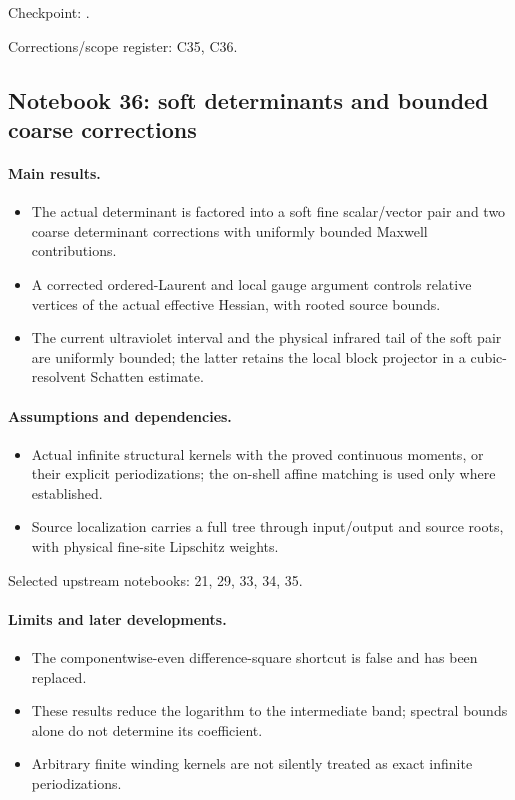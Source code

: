 Checkpoint: .\par
Corrections/scope register: C35, C36.\par

\subsection{Notebook 36: soft determinants and bounded coarse corrections}
\label{hnc-36}
\noindent{}\par

\paragraph{Main results.}
\begin{itemize}
\item The actual determinant is factored into a soft fine scalar/vector pair and two coarse determinant corrections with uniformly bounded Maxwell contributions.
\item A corrected ordered-Laurent and local gauge argument controls relative vertices of the actual effective Hessian, with rooted source bounds.
\item The current ultraviolet interval and the physical infrared tail of the soft pair are uniformly bounded; the latter retains the local block projector in a cubic-resolvent Schatten estimate.
\end{itemize}

\paragraph{Assumptions and dependencies.}
\begin{itemize}
\item Actual infinite structural kernels with the proved continuous moments, or their explicit periodizations; the on-shell affine matching is used only where established.
\item Source localization carries a full tree through input/output and source roots, with physical fine-site Lipschitz weights.
\end{itemize}

Selected upstream notebooks: 21, 29, 33, 34, 35.\par

\paragraph{Limits and later developments.}
\begin{itemize}
\item The componentwise-even difference-square shortcut is false and has been replaced.
\item These results reduce the logarithm to the intermediate band; spectral bounds alone do not determine its coefficient.
\item Arbitrary finite winding kernels are not silently treated as exact infinite periodizations.
\end{itemize}

